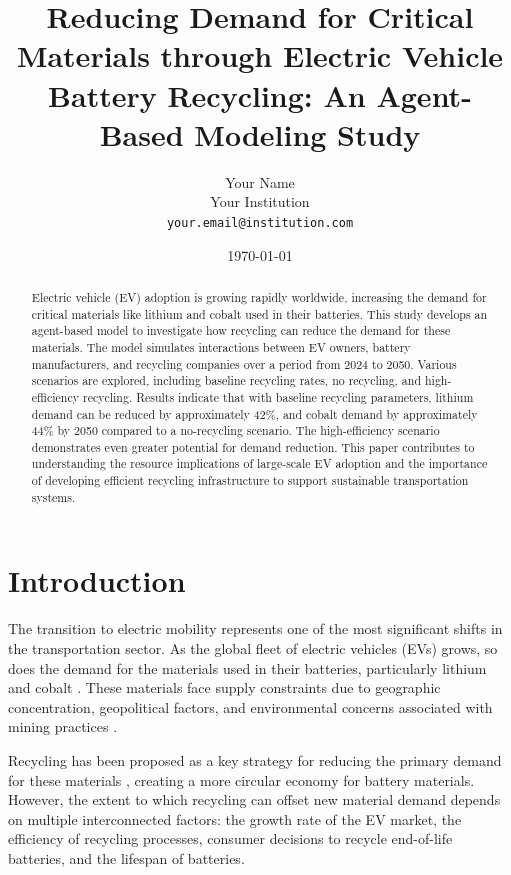 \documentclass[10pt,a4paper,twocolumn]{article}
\title{Reducing Demand for Critical Materials through Electric Vehicle Battery Recycling: An Agent-Based Modeling Study}
\author{
        Your Name\\
        Your Institution\\
        \texttt{your.email@institution.com}
}
\date{\today}
\begin{document}
\maketitle

\begin{abstract}
Electric vehicle (EV) adoption is growing rapidly worldwide, increasing the demand for critical materials like lithium and cobalt used in their batteries. This study develops an agent-based model to investigate how recycling can reduce the demand for these materials. The model simulates interactions between EV owners, battery manufacturers, and recycling companies over a period from 2024 to 2050. Various scenarios are explored, including baseline recycling rates, no recycling, and high-efficiency recycling. Results indicate that with baseline recycling parameters, lithium demand can be reduced by approximately 42\%, and cobalt demand by approximately 44\% by 2050 compared to a no-recycling scenario. The high-efficiency scenario demonstrates even greater potential for demand reduction. This paper contributes to understanding the resource implications of large-scale EV adoption and the importance of developing efficient recycling infrastructure to support sustainable transportation systems.
\end{abstract}

\section{Introduction}
\label{sec:introduction}

The transition to electric mobility represents one of the most significant shifts in the transportation sector. As the global fleet of electric vehicles (EVs) grows, so does the demand for the materials used in their batteries, particularly lithium and cobalt \citep{olivetti2017}. These materials face supply constraints due to geographic concentration, geopolitical factors, and environmental concerns associated with mining practices \citep{dominish2019}.

Recycling has been proposed as a key strategy for reducing the primary demand for these materials \citep{harper2019}, creating a more circular economy for battery materials. However, the extent to which recycling can offset new material demand depends on multiple interconnected factors: the growth rate of the EV market, the efficiency of recycling processes, consumer decisions to recycle end-of-life batteries, and the lifespan of batteries.
\end{document}
